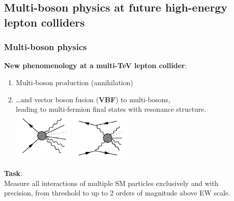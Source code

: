 \documentclass[aspectratio=169]{beamer}
\begin{document}
\subsection{Multi-boson physics at future high-energy lepton colliders}
\begin{frame}
	\frametitle{Multi-boson physics}
	\textcolor{PittRoyal}{\bf New phenomenology at a multi-TeV lepton collider}:
	\begin{enumerate}
		\item Multi-boson production (annihilation)
		\item \dots and vector boson fusion ({\bf VBF}) to multi-bosons, \\leading to multi-fermion final states with resonance structure.\\
		\hspace{5mm}\includegraphics[width=0.23\textwidth]{figs/multiB1.png}
		\hspace{5mm}\includegraphics[width=0.23\textwidth]{figs/multiB2.png}
	\end{enumerate}
	\hfill{}

	\hspace{5mm}\textcolor{PittRoyal}{\bf Task}:\\
	\hspace{5mm}Measure \textcolor{PittRoyal}{all} interactions of multiple SM particles \textcolor{PittRoyal}{exclusively} and with\\ \hspace{5mm}\textcolor{PittRoyal}{precision}, from threshold to up to $2$ orders of magnitude above EW scale.
\end{frame}
\end{document}

